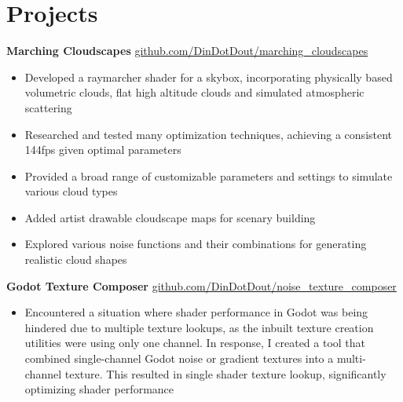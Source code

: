 \documentclass[10pt]{article}       %
\begin{document}
\vspace{-18.5pt}

\section*{Projects}
\textbf{Marching Cloudscapes} \hfill \href{https://github.com/DinDotDout/marching_cloudscapes}{github.com/DinDotDout/marching\_cloudscapes} \\
\vspace{-9pt}
\begin{itemize}
	\item Developed a raymarcher shader for a skybox, incorporating physically based volumetric clouds, flat high altitude clouds and simulated atmospheric scattering
	\item Researched and tested many optimization techniques, achieving a consistent 144fps given optimal parameters
	\item Provided a broad range of customizable parameters and settings to simulate various cloud types
	\item Added artist drawable cloudscape maps for scenary building
	\item Explored various noise functions and their combinations for generating realistic cloud shapes
\end{itemize}

\textbf{Godot Texture Composer} \hfill \href{https://github.com/DinDotDout/noise_texture_composer}{github.com/DinDotDout/noise\_texture\_composer} \\
\vspace{-9pt}
\begin{itemize}
	\item Encountered a situation where shader performance in Godot was being hindered due to multiple texture lookups, as the inbuilt texture creation utilities were using only one channel. In response, I created a tool that combined single-channel Godot noise or gradient textures into a multi-channel texture. This resulted in single shader texture lookup, significantly optimizing shader performance
\end{itemize}

\end{document}
